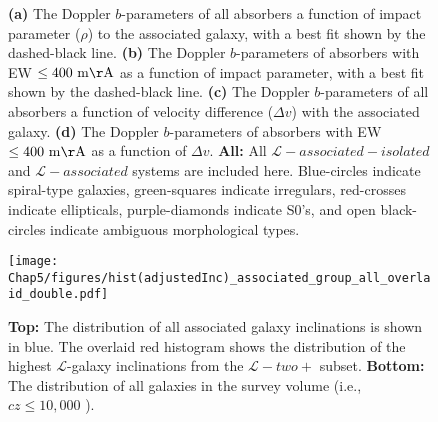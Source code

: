 \begin{figure}[ht!]
        \centering
        \vspace{0pt}
        \caption{\small{\textbf{(a)} The Doppler $b$-parameters of all absorbers a function of impact parameter ($\rho$) to the associated galaxy, with a best fit shown by the dashed-black line. \textbf{(b)} The Doppler $b$-parameters of absorbers with EW $\rm \leq 400~m\AA$ as a function of impact parameter, with a best fit shown by the dashed-black line. \textbf{(c)} The Doppler $b$-parameters of all absorbers a function of velocity difference ($\Delta v$) with the associated galaxy. \textbf{(d)} The Doppler $b$-parameters of absorbers with EW $\rm \leq 400~m\AA$ as a function of $\Delta v$. \textbf{All: } All $\mathcal{L}-associated-isolated$ and $\mathcal{L}-associated$ systems are included here. Blue-circles indicate spiral-type galaxies, green-squares indicate irregulars, red-crosses indicate ellipticals, purple-diamonds indicate S0's, and open black-circles indicate ambiguous morphological types.}}
        \vspace{0pt}
        \label{b_all}
\end{figure}

\begin{figure}[]
\centering
  \texttt{[image: Chap5/figures/hist(adjustedInc)\_associated\_group\_all\_overlaid\_double.pdf]}
  \caption{\small{\textbf{Top:} The distribution of all associated galaxy inclinations is shown in blue. The overlaid red histogram shows the distribution of the highest $\mathcal{L}$-galaxy inclinations from the $\mathcal{L}-two+$ subset. \textbf{Bottom:} The distribution of all galaxies in the survey volume (i.e., $cz \leq 10,000$ \kms).}}
\label{inc_hist}
\vspace{0pt}
\end{figure}




